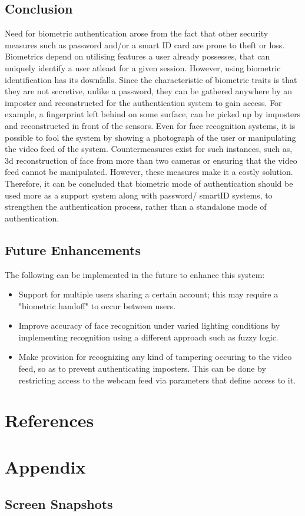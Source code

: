 \documentclass[12pt]{article}			%
\begin{document}
\subsection {Conclusion}
Need for biometric authentication arose from the fact that other security measures such as password and/or a smart ID card are prone to theft or loss. Biometrics depend on utilising features a user already possesses, that can uniquely identify a user atleast for a given session. However, using biometric identification has its downfalls. Since the characteristic of biometric traits is that they are not secretive, unlike a password, they can be gathered anywhere by an imposter and reconstructed for the authentication system to gain access. For example, a fingerprint left behind on some surface, can be picked up by imposters and reconstructed in front of the sensors. Even for face recognition systems, it is possible to fool the system by showing a photograph of the user or manipulating the video feed of the system. Countermeasures exist for such instances, such as, 3d reconstruction of face from more than two cameras or ensuring that the video feed cannot be manipulated. However, these measures make it a costly solution. Therefore, it can be concluded that biometric mode of authentication should be used more as a support system along with password/ smartID systems, to strengthen the authentication process, rather than a standalone mode of authentication.   

\subsection {Future Enhancements}
The following can be implemented in the future to enhance this system:
\begin{itemize}
\item Support for multiple users sharing a certain account; this may require a "biometric handoff" to occur between users.
\item Improve accuracy of face recognition under varied lighting conditions by implementing recognition using a different approach such as fuzzy logic.
\item Make provision for recognizing any kind of tampering occuring to the video feed, so as to prevent authenticating imposters. This can be done by restricting access to the webcam feed via parameters that define access to it.
\end{itemize}


\section{ References }


\section{ Appendix }
\subsection{ Screen Snapshots}

\end{document}
